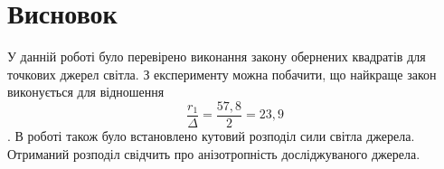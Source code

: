 
\section{Висновок}
\setlength{\parindent}{4em}
\qquad У данній роботі було перевірено виконання закону обернених квадратів для точкових джерел світла. З експерименту можна побачити, що найкраще закон виконується для відношення $$\frac{r_1}{\Delta} = \frac{57,8}{2} = 23,9$$. В роботі також було встановлено кутовий розподіл сили світла джерела. Отриманий розподіл свідчить про анізотропність досліджуваного джерела.
